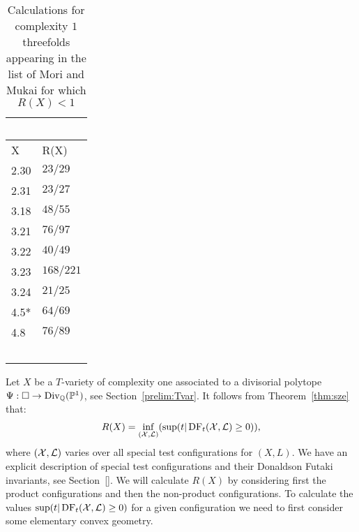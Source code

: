 \begin{table}[H] \centering
\begin{tabular}{l l}
\ & \ \\
\hline
X & R(X) \\
\hline
2.30 & \(23/29\) \\
2.31 & \(23/27\) \\
3.18 & \(48/55\) \\
3.21 & \(76/97\) \\
3.22 & \(40/49\) \\
3.23 & \(168/221\) \\
3.24 & \(21/25\) \\
4.5* & \(64/69\) \\
4.8 & \(76/89\) \\
\hline
\ & \ \\
\end{tabular}
\caption{Calculations for complexity \(1\) threefolds appearing in the list of Mori and Mukai for which \(R(X) <1\)}
\label{table:name}
\end{table}
Let \(X\) be a \(T\)-variety of complexity one associated to a divisorial polytope \(\Psi: \Box \to \operatorname{Div}_{\mathbb{Q}}(\mathbb{P}^1)\), see Section~\ref{prelim:Tvar}.
It follows from Theorem~\ref{thm:sze} that:
\begin{align*}
R(X) = \inf_{({\mathcal{X}},\mathcal{L})}( \sup(t | \mathop{\rm DF}\nolimits_t({\mathcal{X}},\mathcal{L}) \ge 0) ),
\end{align*}
where \(({\mathcal{X}},\mathcal{L})\) varies over all special test configurations for \((X,L)\). We have an explicit description of special test configurations and their Donaldson Futaki invariants, see Section~\ref{}. We will calculate \(R(X)\) by considering first the product configurations and then the non-product configurations. To calculate the values \(\sup(t | \mathop{\rm DF}\nolimits_t({\mathcal{X}},\mathcal{L}) \ge 0)\) for a given configuration we need to first consider some elementary convex geometry.

